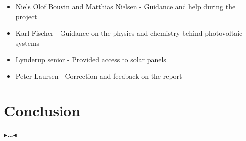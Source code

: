 \documentclass[a4paper]{article}
\newcommand{\todo}[1]{{\color[rgb]{.5,0,0}\textbf{$\blacktriangleright$#1$\blacktriangleleft$}}}
\begin{document}
\begin{itemize}
\item Niels Olof Bouvin and Matthias Nielsen - Guidance and help
  during the project
\item Karl Fischer - Guidance on the physics and chemistry behind
  photovoltaic systems
\item Lynderup senior - Provided access to solar panels
\item Peter Laursen - Correction and feedback on the report
\end{itemize}

\section{Conclusion}
\label{ch:conclusion}

\todo{\dots}




\end{document}
